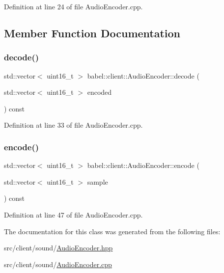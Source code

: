 Definition at line 24 of file Audio\+Encoder.\+cpp.



\subsection{Member Function Documentation}
\mbox{\label{classbabel_1_1client_1_1_audio_encoder_ae0c93b9068bbb1634796abcf93b7489e}} 
\subsubsection{\texorpdfstring{decode()}{decode()}}
{\footnotesize\ttfamily std\+::vector$<$ uint16\+\_\+t $>$ babel\+::client\+::\+Audio\+Encoder\+::decode (\begin{DoxyParamCaption}\item[{std\+::vector$<$ uint16\+\_\+t $>$}]{encoded }\end{DoxyParamCaption}) const}



Definition at line 33 of file Audio\+Encoder.\+cpp.

\mbox{\label{classbabel_1_1client_1_1_audio_encoder_a8bd0865794b01fac51a8c1b45dcbbad0}} 
\subsubsection{\texorpdfstring{encode()}{encode()}}
{\footnotesize\ttfamily std\+::vector$<$ uint16\+\_\+t $>$ babel\+::client\+::\+Audio\+Encoder\+::encode (\begin{DoxyParamCaption}\item[{std\+::vector$<$ uint16\+\_\+t $>$}]{sample }\end{DoxyParamCaption}) const}



Definition at line 47 of file Audio\+Encoder.\+cpp.



The documentation for this class was generated from the following files\+:\begin{DoxyCompactItemize}
\item 
src/client/sound/\mbox{\hyperlink{_audio_encoder_8hpp}{Audio\+Encoder.\+hpp}}\item 
src/client/sound/\mbox{\hyperlink{_audio_encoder_8cpp}{Audio\+Encoder.\+cpp}}\end{DoxyCompactItemize}
